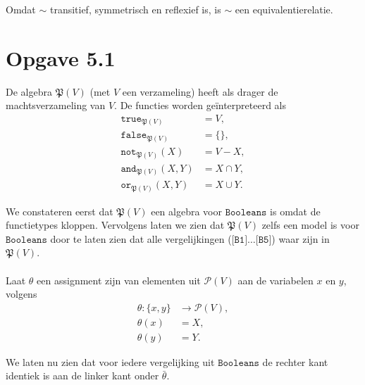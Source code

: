 \documentclass[a4paper,11pt]{article}
\begin{document}
Omdat $\sim$ transitief, symmetrisch en reflexief is, is $\sim$ een
equivalentierelatie.


\section*{Opgave 5.1}

De algebra $\mathfrak{P}(V)$ (met $V$ een verzameling) heeft als drager de
machtsverzameling van $V$. De functies worden ge\"interpreteerd als
\begin{align*}
\texttt{true}_{\mathfrak{P}(V)}     &= V , \\
\texttt{false}_{\mathfrak{P}(V)}    &= \{\} , \\
\texttt{not}_{\mathfrak{P}(V)}(X)   &= V - X , \\
\texttt{and}_{\mathfrak{P}(V)}(X,Y) &= X \cap Y , \\
\texttt{or}_{\mathfrak{P}(V)}(X,Y)  &= X \cup Y .
\end{align*}

We constateren eerst dat $\mathfrak{P}(V)$ een algebra voor
$\texttt{Booleans}$ is omdat de functietypes kloppen. Vervolgens laten we zien
dat $\mathfrak{P}(V)$ zelfs een model is voor $\texttt{Booleans}$ door te
laten zien dat alle vergelijkingen ($\texttt{[B1]} \ldots \texttt{[B5]}$) waar
zijn in $\mathfrak{P}(V)$.

\paragraph{}

Laat $\theta$ een assignment zijn van elementen uit $\mathcal{P}(V)$ aan
de variabelen $x$ en $y$, volgens
\begin{align*}
\theta    : \{x,y\} &\rightarrow \mathcal{P}(V), \\
\theta(x) &= X, \\
\theta(y) &= Y.
\end{align*}

We laten nu zien dat voor iedere vergelijking uit $\texttt{Booleans}$ de
rechter kant identiek is aan de linker kant onder $\bar \theta$.
\end{document}
